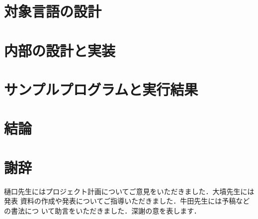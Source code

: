 \documentclass[a4paper,titlepage,report]{jsbook}
\begin{document}
\section{対象言語の設計}\label{sc:lang_design}

\section{内部の設計と実装}\label{sc:impl}

\section{サンプルプログラムと実行結果}\label{sc:sample}

\section{結論}\label{sc:conclu}

\section*{謝辞}
樋口先生にはプロジェクト計画についてご意見をいただきました．大墳先生には発表
資料の作成や発表についてご指導いただきました．牛田先生には予稿などの書法につ
いて助言をいただきました．深謝の意を表します．




\backmatter
\appendix
\end{document}
